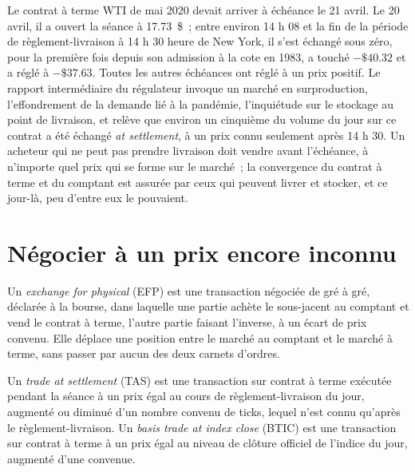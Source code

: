 \begin{example}\label{ex:m1:basis-roll-and-delivery:wti}
Le contrat à terme WTI de mai 2020 devait arriver à échéance le 21 avril. Le 20 avril, il a ouvert
la séance à 17.73~\$~; entre environ 14 h 08 et la fin de la période de règlement-livraison
à 14 h 30 heure de New York, il s'est échangé sous zéro, pour la première fois depuis
son admission à la cote en 1983, a touché $-\$40.32$ et a réglé à
$-\$37.63$. Toutes les autres échéances ont réglé à un prix positif. Le rapport intermédiaire du régulateur
invoque un marché en surproduction, l'effondrement de la demande lié à la
pandémie, l'inquiétude sur le stockage au point de livraison, et relève que
environ un cinquième du volume du jour sur ce contrat a été échangé \emph{at
settlement}, à un prix connu seulement après 14 h 30. Un acheteur qui ne peut pas prendre
livraison doit vendre avant l'échéance, à n'importe quel prix qui se forme sur le marché~; la convergence
du contrat à terme et du comptant est assurée par ceux qui peuvent livrer et stocker, et ce
jour-là, peu d'entre eux le pouvaient.
\end{example}

\section{Négocier à un prix encore inconnu}

\begin{definition}\label{def:m1:basis-roll-and-delivery:efp}
Un \emph{exchange for physical} (EFP) est une
transaction négociée de gré à gré, déclarée à la bourse, dans laquelle une partie
achète le sous-jacent au comptant et vend le contrat à terme, l'autre partie faisant
l'inverse, à un écart de prix convenu. Elle déplace une position entre le marché au comptant
et le marché à terme, sans passer par aucun des deux carnets d'ordres.
\end{definition}

\begin{definition}\label{def:m1:basis-roll-and-delivery:tas}
Un \emph{trade at settlement} (TAS) est une transaction sur contrat à terme
exécutée pendant la séance à un prix égal au cours de règlement-livraison du jour,
augmenté ou diminué d'un nombre convenu de ticks, lequel n'est connu qu'après le
règlement-livraison.
Un \emph{basis trade at index close} (BTIC) est une transaction sur contrat à terme à un prix égal au niveau de clôture
officiel de l'indice du jour, augmenté d'une  convenue.
\end{definition}

